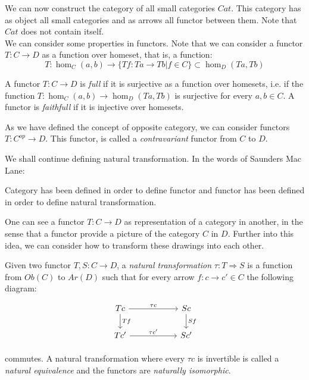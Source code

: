 We can now construct the category of all small categories $Cat$. This category has as object all small categories and as arrows all functor between them. Note that $Cat$ does not contain itself.\\

We can consider some properties in functors. Note that we can consider a functor $T:C\to D$ as a function over homeset, that is, a function: 
$$T:\hom_C(a,b) \to \{Tf: Ta \to Tb | f \in C\} \subset \hom_D(Ta,Tb)$$

\begin{definition}
  A functor $T:C\to D$ is \emph{full} if it is surjective as a function over homesets, i.e. if the function $T:\hom_C(a,b) \to  \hom_D(Ta,Tb)$  is surjective for every $a,b \in C$. A functor is \emph{faithfull} if it is injective over homesets.
\end{definition}

As we have defined the concept of opposite category, we can consider functors $T:C^{op} \to D$. This functor, is called a \emph{contravariant} functor from $C$ to $D$.





We shall continue defining natural transformation. In the words of Saunders Mac Lane:

\begin{displayquote}
Category has been defined in order to define functor and functor has been defined in order to define natural transformation.
\end{displayquote}




One can see a functor $T:C\to D$ as representation of a category in another, in the sense that a functor provide a picture of the category $C$ in $D$. Further into this idea, we can consider how to transform these drawings into each other. 

\begin{definition}
  Given two functor $T,S:C\to D$, a \emph{natural transformation} $\tau : T \Rightarrow S$ is a function from $Ob(C)$ to $Ar(D)$ such that for every arrow $f:c \to c' \in C$ the following diagram:
\[
  \begin{tikzpicture}
  \node {\begin{tikzcd}[column sep=20mm]
      Tc\ar[r,"\tau c"]\ar[d,"Tf"] & Sc\ar[d,"Sf"]\\
      Tc'\ar[r,"\tau c'"] & Sc'
  \end{tikzcd}};
\end{tikzpicture}
\]

commutes. A natural transformation where every $\tau c$ is invertible is called a \emph{natural equivalence} and the functors are \emph{naturally isomorphic}.
  \end{definition}


